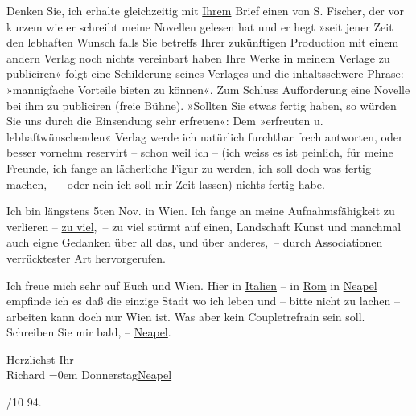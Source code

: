 \pstart
           Denken Sie, ich erhalte gleichzeitig mit \uline{Ihrem} Brief
               einen von S. Fischer, der vor kurzem wie er
               schreibt meine Novellen gelesen hat und er hegt »seit jener Zeit den lebhaften Wunsch
                  {\pb}falls Sie betreffs Ihrer
               zukünftigen Production mit einem andern Verlag noch nichts vereinbart haben Ihre
               Werke in meinem Verlage zu publiciren« folgt eine Schilderung seines Verlages und die
               inhaltsschwere Phrase: »mannigfache Vorteile bieten zu können«. Zum Schluss
               Aufforderung eine Novelle bei ihm zu publiciren (freie Bühne). »Sollten Sie {\pb}etwas fertig haben, so würden Sie uns durch die Einsendung sehr erfreuen«: Dem
               »erfreuten u. lebhaftwünschenden« Verlag werde ich natürlich furchtbar frech
               antworten, oder besser vornehm reservirt – schon weil ich – (ich weiss es ist
               peinlich, für meine Freunde, ich fange an lächerliche Figur zu werden, ich soll doch
               was fer{\pb}tig machen, –  oder nein
               ich soll mir Zeit lassen) nichts fertig habe. –\pend
           
\pstart
           Ich bin längstens 5ten Nov. in Wien.
               Ich fange an meine Aufnahmsfähigkeit zu verlieren – \uline{zu
                  viel}, – zu viel stürmt auf einen, Landschaft Kunst und manchmal {\pb}auch eigne Gedanken über all das,
               und über anderes, – durch Associationen verrücktester Art hervorgerufen.\pend
           
\pstart
           Ich freue mich sehr auf Euch und Wien. Hier in \uline{Italien} – in \uline{Rom} in \uline{Neapel} empfinde ich es daß die einzige Stadt wo ich leben {\pb}und – bitte nicht zu lachen –
               arbeiten kann doch nur Wien ist. Was aber kein
               Coupletrefrain sein soll. Schreiben Sie mir bald, – \uline{Neapel}.\pend
           
\pstart
           Herzlichst Ihr{\\[\baselineskip]}\spacefill\mbox{Richard}\pend
           \leftskip=0em{}
\pstart
           Donnerstag\hspace*{1.5em}\uline{Neapel}\pend
           
/10 94.\pend
           \endnumbering{}  \newcommand{\dateiname}{L00384}\newcommand{\titel}{Richard Beer-Hofmann an Arthur Schnitzler, 18. 10. 1894}\newcommand{\editorInnen}{Martin Anton Müller und Gerd-Hermann Susen}
